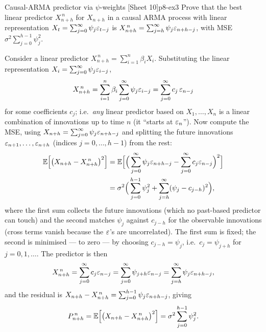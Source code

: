 \begin{exercise}{Causal-ARMA predictor via $\psi$-weights \quad\textnormal{[Sheet 10]}}{p8-ex3}
Prove that the best linear predictor $X^{\,n}_{n+h}$ for $X_{n+h}$ in a causal
ARMA process with linear representation
$X_t=\sum_{j=0}^\infty\psi_j\varepsilon_{t-j}$ is
$X^{\,n}_{n+h}=\sum_{j=h}^\infty\psi_j\varepsilon_{n+h-j}$, with MSE
$\sigma^2\sum_{j=0}^{h-1}\psi_j^2$.
\end{exercise}
\begin{solution}
Consider a linear predictor $X^{\,n}_{n+h}=\sum_{i=1}^n\beta_iX_i$. Substituting
the linear representation $X_i=\sum_{j=0}^\infty\psi_j\varepsilon_{i-j}$,
\[
X^{\,n}_{n+h}=\sum_{i=1}^n\beta_i\sum_{j=0}^\infty\psi_j\varepsilon_{i-j}
=\sum_{j=0}^\infty c_j\,\varepsilon_{n-j}
\]
for some coefficients $c_j$; i.e.\ \emph{any} linear predictor based on
$X_1,\dots,X_n$ is a linear combination of innovations up to time $n$ (it
``starts at $\varepsilon_n$''). Now compute the MSE, using
$X_{n+h}=\sum_{j=0}^\infty\psi_j\varepsilon_{n+h-j}$ and splitting the future
innovations $\varepsilon_{n+1},\dots,\varepsilon_{n+h}$ (indices $j=0,\dots,h-1$) from the
rest:
\[
\begin{aligned}
\mathbb{E}\Big[\big(X_{n+h}-X^{\,n}_{n+h}\big)^2\Big]
&=\mathbb{E}\Big[\Big(\sum_{j=0}^\infty\psi_j\varepsilon_{n+h-j}-\sum_{j=0}^\infty c_j\varepsilon_{n-j}\Big)^2\Big]\\
&=\sigma^2\Big(\sum_{j=0}^{h-1}\psi_j^2+\sum_{j=h}^\infty(\psi_j-c_{j-h})^2\Big),
\end{aligned}
\]
where the first sum collects the future innovations (which no past-based
predictor can touch) and the second matches $\psi_j$ against $c_{j-h}$ for the
observable innovations (cross terms vanish because the $\varepsilon$'s are
uncorrelated). The first sum is fixed; the second is minimised --- to zero --- by
choosing $c_{j-h}=\psi_j$, i.e.\ $c_j=\psi_{j+h}$ for $j=0,1,\dots$. The
predictor is then
\[
X^{\,n}_{n+h}=\sum_{j=0}^\infty c_j\varepsilon_{n-j}=\sum_{j=0}^\infty\psi_{j+h}\varepsilon_{n-j}
=\sum_{j=h}^\infty\psi_j\varepsilon_{n+h-j},
\]
and the residual is $X_{n+h}-X^{\,n}_{n+h}=\sum_{j=0}^{h-1}\psi_j\varepsilon_{n+h-j}$,
giving
\[
P^{\,n}_{n+h}=\mathbb{E}\Big[\big(X_{n+h}-X^{\,n}_{n+h}\big)^2\Big]=\sigma^2\sum_{j=0}^{h-1}\psi_j^2 .
\]
\end{solution}

